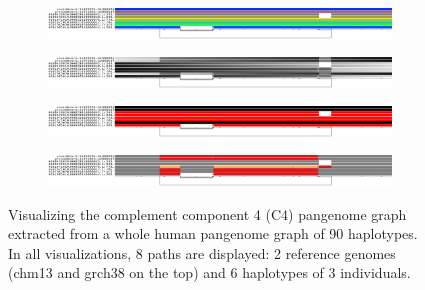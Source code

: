 \begin{figure}[h!]
    \begin{subfigure}{\linewidth}
        \caption{}
        \centering
        \includegraphics[width=1.0\linewidth, trim=0 +2cm 0 0.5cm]{fig/visualization_1D/chr6_pan_fa_a2fb268_4030258_d9f1245_smooth_gfa_C4_sorted}
        \label{fig:odgi_viz_default}
    \end{subfigure}
    \begin{subfigure}{\linewidth}
        \caption{}
        \centering
        \includegraphics[width=1.0\linewidth, trim=0 +2cm 0 0.5cm]{fig/visualization_1D/chr6_pan_fa_a2fb268_4030258_d9f1245_smooth_gfa_C4_sorted_du}
        \label{fig:odgi_viz_color_by_path_pos}
    \end{subfigure}
    \begin{subfigure}{\linewidth}
        \caption{}
        \centering
        \includegraphics[width=\linewidth, trim=0 +2cm 0 0.5cm]{fig/visualization_1D/chr6_pan_fa_a2fb268_4030258_d9f1245_smooth_gfa_C4_sorted_z}
        \label{fig:odgi_viz_color_by_inversion_rate}
    \end{subfigure}
    \begin{subfigure}{1\linewidth}
        \caption{}
        \centering
        \includegraphics[width=\linewidth, trim=0 1.5cm 0 0.5cm]{fig/visualization_1D/chr6_pan_fa_a2fb268_4030258_d9f1245_smooth_gfa_C4_sorted_m}
        \label{fig:odgi_viz_color_by_path_depth}
    \end{subfigure}
    \caption{
        Visualizing the complement component 4 (C4) pangenome graph extracted from a whole human pangenome graph of 90 haplotypes.
        In all visualizations, 8 paths are displayed: 2 reference genomes (chm13 and grch38 on the top) and 6 haplotypes of 3 individuals.
}
\end{figure}
